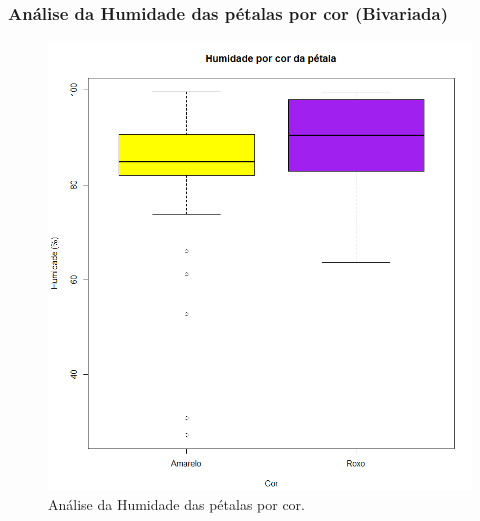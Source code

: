 \documentclass{article}
\begin{document}
\paragraph{}
\paragraph{}
\paragraph{}
\paragraph{}
\paragraph{}
\paragraph{}

\subsubsection{Análise da Humidade das pétalas por cor (Bivariada)}


\begin{figure}[h]
       \centering %
        \includegraphics[scale=0.6]{Humidade por cor.png}
       \caption{Análise da Humidade das pétalas por cor.}
       \label{fig:logo}
    \end{figure}
\end{document}
